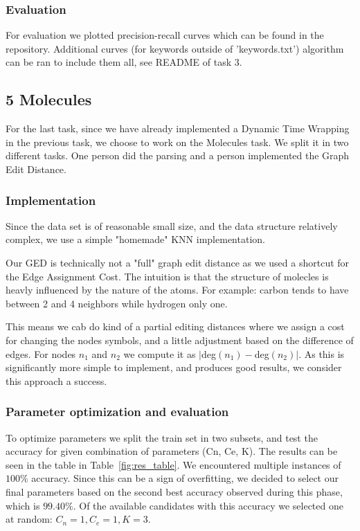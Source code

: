 \documentclass[12pt]{article}
\begin{document}
\subsubsection*{Evaluation}

For evaluation we plotted precision-recall curves which can be found in the repository. Additional curves (for keywords outside of 'keywords.txt') algorithm can be ran to include them all, see README of task 3.

\subsection*{5 Molecules}
For the last task, since we have already implemented a Dynamic Time Wrapping in the previous task, we choose to work on the Molecules task. We split it in two different tasks. One person did the parsing and a person implemented the Graph Edit Distance.

\subsubsection*{Implementation}

Since the data set is of reasonable small size, and the data structure relatively complex,
we use a simple "homemade" KNN implementation.

Our GED is technically not a "full" graph edit distance as we used a shortcut for the Edge Assignment Cost. The intuition is that the structure of molecles is heavly influenced by the nature of the atoms. For example: carbon tends to have between 2 and 4 neighbors while hydrogen only one.

This means we cab do kind of a partial editing distances where we assign a cost for changing the nodes symbols, and a little adjustment based on the difference of edges. For nodes $n_1$ and $n_2$ we compute it as $|$deg$(n_1) - $deg$(n_2)|$. As this is significantly more simple to implement, and produces good results, we consider this approach a success.

\subsubsection*{Parameter optimization and evaluation}

To optimize parameters we split the train set in two subsets, and test the accuracy for given combination of parameters (Cn, Ce, K).
The results can be seen in the table in Table~\ref{fig:res_table}. We encountered multiple instances of $100\%$ accuracy. Since this can be a sign of overfitting, we decided to select
our final parameters based on the second best accuracy observed during this phase, which is $99.40\%$. Of the available candidates with this accuracy we selected one at random: $C_n = 1, C_e = 1, K = 3$.
\end{document}
